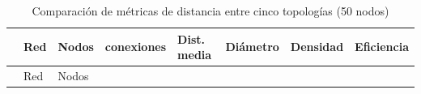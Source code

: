 \documentclass[
  letterpaper,
  DIV=11,
  numbers=noendperiod]{scrreprt}
\begin{document}
\begin{longtable}[]{@{}
  >{\raggedright\arraybackslash}p{}
  >{\raggedright\arraybackslash}p{}
  >{\raggedleft\arraybackslash}p{}
  >{\raggedleft\arraybackslash}p{}
  >{\raggedleft\arraybackslash}p{}
  >{\raggedleft\arraybackslash}p{}
  >{\raggedleft\arraybackslash}p{}
  >{\raggedleft\arraybackslash}p{}@{}}
\caption{Comparación de métricas de distancia entre cinco topologías (50
nodos)}\tabularnewline
\toprule\noalign{}
\begin{minipage}[b]{\linewidth}\raggedright
\end{minipage} & \begin{minipage}[b]{\linewidth}\raggedright
Red
\end{minipage} & \begin{minipage}[b]{\linewidth}\raggedleft
Nodos
\end{minipage} & \begin{minipage}[b]{\linewidth}\raggedleft
conexiones
\end{minipage} & \begin{minipage}[b]{\linewidth}\raggedleft
Dist. media
\end{minipage} & \begin{minipage}[b]{\linewidth}\raggedleft
Diámetro
\end{minipage} & \begin{minipage}[b]{\linewidth}\raggedleft
Densidad
\end{minipage} & \begin{minipage}[b]{\linewidth}\raggedleft
Eficiencia
\end{minipage} \\
\midrule\noalign{}
\endfirsthead
\toprule\noalign{}
\begin{minipage}[b]{\linewidth}\raggedright
\end{minipage} & \begin{minipage}[b]{\linewidth}\raggedright
Red
\end{minipage} & \begin{minipage}[b]{\linewidth}\raggedleft
Nodos
\end{minipage} & \begin{minipage}[b]{\linewidth}\raggedleft

\end{minipage}
\end{longtable}
\end{document}
